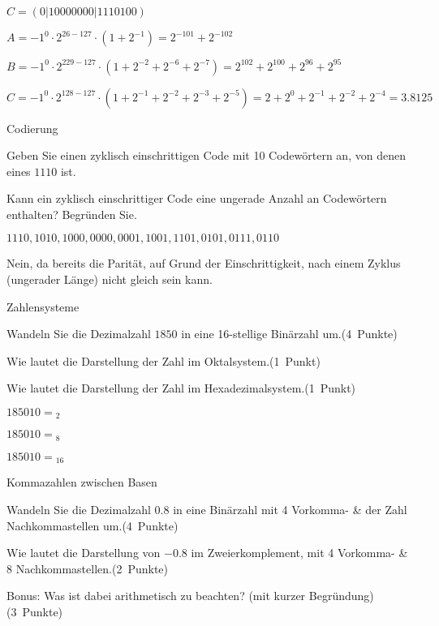 \documentclass{exercisesheet}
\begin{document}
\begin{solutions}
  \item $C = (0|10000000|1110100)$
  \item
  $A = {-1}^0 \cdot 2^{26-127} \cdot (1+2^{-1}) = 2^{-101} + 2^{-102}$\par
  $B = {-1}^0 \cdot 2^{229-127} \cdot (1+2^{-2}+2^{-6}+2^{-7}) = 2^{102} + 2^{100} + 2^{96} + 2^{95}$\par
  $C = {-1}^0 \cdot 2^{128-127} \cdot (1+2^{-1}+2^{-2}+2^{-3}+2^{-5}) = 2 + 2^0 + 2^{-1} + 2^{-2} + 2^{-4} = 3.8125$
\end{solutions}

\begin{exercises}{Codierung}
\item Geben Sie einen zyklisch einschrittigen Code mit 10 Codewörtern an, von denen eines $1110$ ist.
\item Kann ein zyklisch einschrittiger Code eine ungerade Anzahl an Codewörtern enthalten? Begründen Sie.
\end{exercises}

\begin{solutions}
  \item $1110, 1010, 1000, 0000, 0001, 1001, 1101, 0101, 0111, 0110$
  \item Nein, da bereits die Parität, auf Grund der Einschrittigkeit, nach einem Zyklus (ungerader Länge) nicht gleich sein kann.
\end{solutions}

\begin{exercises}{Zahlensysteme}
\item Wandeln Sie die Dezimalzahl $1850$ in eine 16-stellige Binärzahl um.\hfill(4~Punkte)
\item Wie lautet die Darstellung der Zahl im Oktalsystem.\hfill(1~Punkt)
\item Wie lautet die Darstellung der Zahl im Hexadezimalsystem.\hfill(1~Punkt)
\end{exercises}

\begin{solutions}
  \item $1850{10} = {}_2$
  \item $1850{10} = {}_8$
  \item $1850{10} = {\mathrm{}}_{16}$
\end{solutions}

\begin{exercises}{Kommazahlen zwischen Basen}
\item Wandeln Sie die Dezimalzahl $0.8$ in eine Binärzahl mit 4 Vorkomma- \& der Zahl Nachkommastellen um.\hfill(4~Punkte)
\item Wie lautet die Darstellung von $-0.8$ im Zweierkomplement, mit 4 Vorkomma- \& 8 Nachkommastellen.\hfill(2~Punkte)
\item Bonus: Was ist dabei arithmetisch zu beachten? (mit kurzer Begründung)\hfill(3~Punkte)
\end{exercises}
\end{document}

